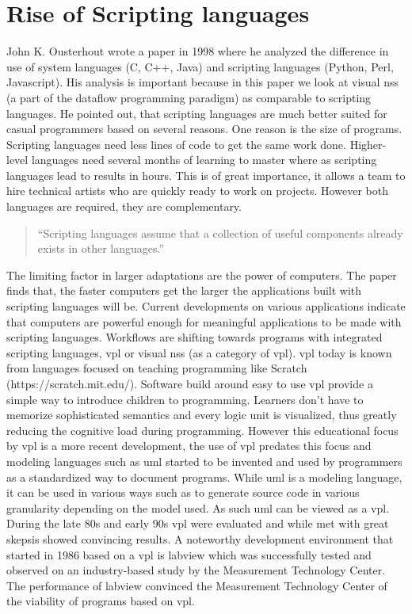 \documentclass[10pt,a4paper]{article}
\begin{document}
\section{Rise of Scripting languages}
\begin{multicols}{2}
John K. Ousterhout wrote a paper\cite{Ousterhout1998} in 1998 where he analyzed the difference in use of system languages (C, C++, Java) and scripting languages (Python, Perl, Javascript). His analysis is important because in this paper we look at visual \gls{ns}s (a part of the dataflow programming paradigm\cite{wiki:Dataflow}) as comparable to scripting languages. He pointed out, that scripting languages are much better suited for casual programmers based on several reasons. One reason is the size of programs. Scripting languages need less lines of code to get the same work done. Higher-level languages need several months of learning to master where as scripting languages lead to results in hours. This is of great importance, it allows a team to hire technical artists who are quickly ready to work on projects. However both languages are required, they are complementary.\begin{quote}
“Scripting languages assume that a collection of useful components already exists in other languages.”\citep[p.~2]{Ousterhout1998}
\end{quote}
The limiting factor in larger adaptations are the power of computers. The paper finds that, the faster computers get the larger the applications built with scripting languages will be. Current developments on various applications indicate that computers are powerful enough for meaningful applications to be made with scripting languages. Workflows are shifting towards programs with integrated scripting languages, \gls{vpl} or visual \gls{ns}s (as a category of \gls{vpl}).
\gls{vpl} today is known from languages focused on teaching programming like Scratch (https://scratch.mit.edu/). Software build around easy to use \gls{vpl} provide a simple way to introduce children to programming. Learners don’t have to memorize sophisticated semantics and every logic unit is visualized, thus greatly reducing the cognitive load during programming. However this educational focus by \gls{vpl} is a more recent development, the use of \gls{vpl} predates this focus and modeling languages such as \gls{uml} started to be invented and used by programmers as a standardized way to document programs. While \gls{uml} is a modeling language, it can be used in various ways such as to generate source code\cite{VisualStudioDocsContributors2016} in various granularity depending on the model used. As such \gls{uml} can be viewed as a \gls{vpl}. During the late 80s and early 90s \gls{vpl} were evaluated and while met with great skepsis showed convincing results\cite{WHITLEY1997}. A noteworthy development environment that started in 1986 based on a \gls{vpl} is \gls{labview} which was successfully tested and observed on an industry-based study by the Measurement Technology Center\cite{Jamal}. The performance of \gls{labview} convinced the Measurement Technology Center of the viability of programs based on \gls{vpl}.

\end{multicols}
\end{document}
